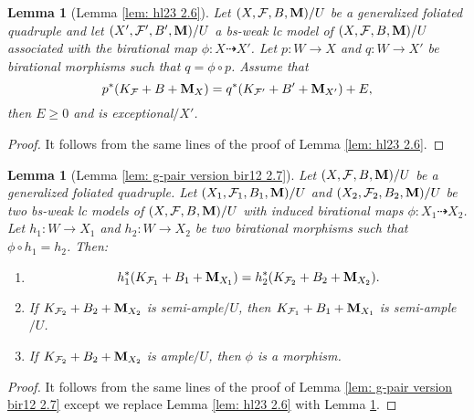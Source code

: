 \documentclass[11pt]{amsart}
\numberwithin{equation}{section}
\newcommand{\Mm}{{\bf{M}}}
\newcommand{\Ff}{\mathcal{F}}
\newtheorem{lem}[thm]{Lemma}
\theoremstyle{definition}
\theoremstyle{definition}
\theoremstyle{definition}
\begin{document}
\begin{lem}[Lemma \ref{lem: hl23 2.6}]\label{lem: hl23 2.6 gfq}
Let $(X,\Ff,B,\Mm)/U$ be a generalized foliated quadruple and let $(X',\Ff',B',\Mm)/U$ a bs-weak lc model of $(X,\Ff,B,\Mm)/U$ associated with the birational map $\phi: X\dashrightarrow X'$. Let $p: W\rightarrow X$ and $q: W\rightarrow X'$ be birational morphisms such that $q=\phi\circ p$. Assume that
$$p^*(K_\Ff+B+\Mm_X)=q^*(K_{\Ff'}+B'+\Mm_{X'})+E,$$
then $E\geq 0$ and is exceptional$/X'$.
\end{lem}
\begin{proof}
    It follows from the same lines of the proof of Lemma \ref{lem: hl23 2.6}.
\end{proof}

\begin{lem}[Lemma \ref{lem: g-pair version bir12 2.7}]\label{lem: g-pair version bir12 2.7 gfq}
Let $(X,\Ff,B,\Mm)/U$ be a generalized foliated quadruple. Let $(X_1,\Ff_1,B_1,\Mm)/U$ and $(X_2,\Ff_2,B_2,\Mm)/U$ be two bs-weak lc models of $(X,\Ff,B,\Mm)/U$ with induced birational maps $\phi: X_1\dashrightarrow X_2$. Let $h_1: W\rightarrow X_1$ and $h_2: W\rightarrow X_2$ be two birational morphisms such that $\phi\circ h_1=h_2$. Then:
\begin{enumerate}
    \item $$h_1^*(K_{\Ff_1}+B_1+\Mm_{X_1})=h_2^*(K_{\Ff_2}+B_2+\Mm_{X_2}).$$
    \item If $K_{\Ff_2}+B_2+\Mm_{X_2}$ is semi-ample$/U$, then $K_{\Ff_1}+B_1+\Mm_{X_1}$ is semi-ample$/U$.
    \item If $K_{\Ff_2}+B_2+\Mm_{X_2}$ is ample$/U$, then $\phi$ is a morphism.
\end{enumerate}
\end{lem}
\begin{proof}
    It follows from the same lines of the proof of Lemma \ref{lem: g-pair version bir12 2.7} except we replace  Lemma \ref{lem: hl23 2.6} with  Lemma \ref{lem: hl23 2.6 gfq}.
\end{proof}
\end{document}
